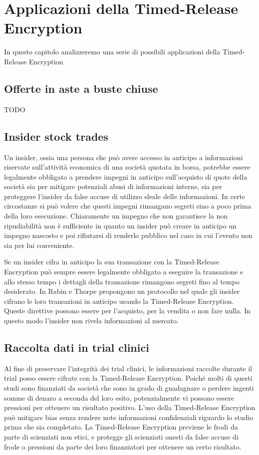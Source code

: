 \chapter{Applicazioni della Timed-Release Encryption}
\label{chap:possibili-usi}

In questo capitolo analizzeremo una serie di possibili 
applicazioni della Timed-Release Encryption.

\section{Offerte in aste a buste chiuse}
TODO 

\section{Insider stock trades}
Un insider, ossia una persona che può avere accesso in anticipo a informazioni
riservate sull’attività economica di una società quotata in borsa,
potrebbe essere legalmente obbligato a
prendere impegni in anticipo sull'acquisto di quote della società
sia per mitigare potenziali
abusi di informazioni interne, sia per proteggere l'insider da false
accuse di utilizzo sleale delle informazioni.
In certe circostanze
si può volere che questi impegni rimangano segreti sino a poco prima
della loro esecuzione. Chiaramente un impegno che non garantisce la non ripudiabilità
non è sufficiente in quanto un insider può creare in anticipo un impegno nascosto
e poi rifiutarsi di renderlo pubblico nel caso in cui l'evento non sia per lui conveniente.

Se un insider cifra in anticipo la sua transazione con la Timed-Release Encryption
può sempre essere legalmente obbligato a eseguire la transazione e allo stesso tempo
i dettagli della transazione rimangono segreti fino al tempo desiderato.
In \cite{rabin2006time} Rabin e Thorpe propongono un protocollo nel quale gli insider
cifrano le loro transazioni in anticipo usando la Timed-Release Encryption.
Queste direttive possono essere per l'acquisto, per la vendita o non fare nulla. In questo
modo l'insider non rivela informazioni al mercato.

\section{Raccolta dati in trial clinici}
Al fine di preservare l'integrità dei trial clinici, le informazioni raccolte durante il trial
posso essere cifrate con la Timed-Release Encryption.
Poiché molti di questi studi sono finanziati da società che sono in grado di guadagnare
o perdere ingenti somme di denaro a seconda del loro esito,
potenzialmente vi possono essere pressioni per ottenere un risultato positivo.
L'uso della Timed-Release Encryption può mitigare bias senza rendere note informazioni
confidenziali riguardo lo studio prima che sia completato. La Timed-Release Encryption
previene le frodi da parte di scienziati non etici, e protegge gli scienziati onesti
da false accuse di frode o pressioni da parte dei loro finanziatori per ottenere un certo risultato.


